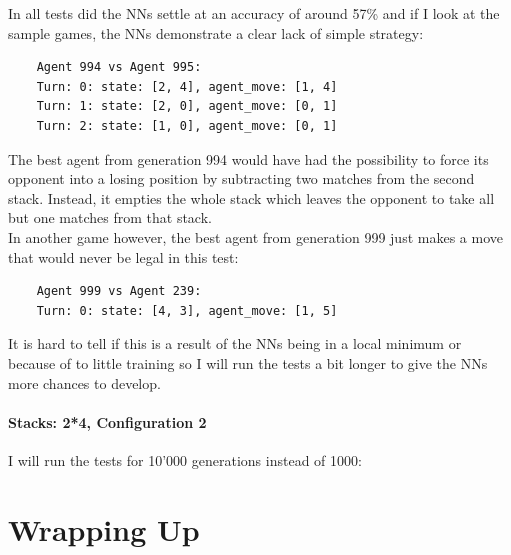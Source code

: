 \documentclass[11pt]{report}
\begin{document}
\begin{enumerate}
\begin{center}
    \end{center}
    In all tests did the NNs settle at an accuracy of around 57\% and if I look at the sample games, the NNs demonstrate a clear lack of simple strategy:
    \begin{verbatim}
    Agent 994 vs Agent 995:
    Turn: 0: state: [2, 4], agent_move: [1, 4]
    Turn: 1: state: [2, 0], agent_move: [0, 1]
    Turn: 2: state: [1, 0], agent_move: [0, 1]
    \end{verbatim}
    The best agent from generation 994 would have had the possibility to force its opponent into a losing position by subtracting two matches from the second stack.
    Instead, it empties the whole stack which leaves the opponent to take all but one matches from that stack.
    \\
    In another game however, the best agent from generation 999 just makes a move that would never be legal in this test:
    \begin{verbatim}
    Agent 999 vs Agent 239:
    Turn: 0: state: [4, 3], agent_move: [1, 5]
    \end{verbatim}
    It is hard to tell if this is a result of the NNs being in a local minimum or because of to little training so I will run the tests a bit longer to give the NNs more chances to develop.

    \subsubsection{Stacks: 2*4, Configuration 2}
    I will run the tests for 10'000 generations instead of 1000:


    \chapter{Wrapping Up}\label{ch:wrapping-up}



\end{enumerate}
\end{document}
